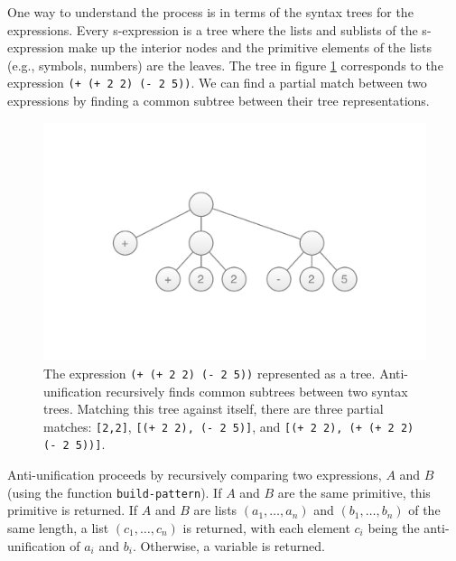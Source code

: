 \documentclass[a4paper,10pt]{article}
\begin{document}
One way to understand the process is in terms of the syntax trees for the expressions.  Every s-expression is a tree where the lists and sublists of the s-expression make up the interior nodes and the primitive elements of the lists (e.g., symbols, numbers) are the leaves.  The tree in figure \ref{expressionTree} corresponds to the expression \texttt{(+ (+ 2 2) (- 2 5))}. We can find a partial match between two expressions by finding a common subtree between their tree representations.
\begin{figure}[t]
\includegraphics[scale=.30]{./figures/expressionTree2.pdf}
  \caption{The expression \texttt{(+ (+ 2 2) (- 2 5))} represented as a tree. Anti-unification recursively finds common subtrees between two syntax trees. Matching this tree against itself, there are three partial matches: \texttt{[2,2]}, \texttt{[(+ 2 2), (- 2 5)]}, and \texttt{[(+ 2 2), (+ (+ 2 2) (- 2 5))]}.}
  \label{expressionTree}
\end{figure}

Anti-unification proceeds by recursively comparing two expressions, $A$ and $B$ (using the function \texttt{build-pattern}).  If $A$ and $B$ are the same primitive, this primitive is returned.  If $A$ and $B$ are lists $(a_1,\ldots,a_n)$ and $(b_1,\ldots,b_n)$ of the same length, a list $(c_1,\ldots,c_n)$ is returned, with each element $c_i$ being the anti-unification of $a_i$ and $b_i$.  Otherwise, a variable is returned.
\end{document}
